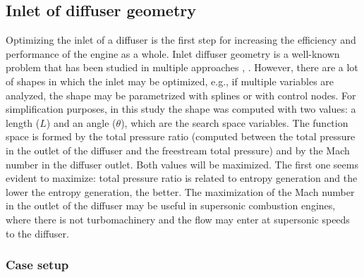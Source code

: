 \newpage

\subsection{Inlet of diffuser geometry}

Optimizing the inlet of a diffuser is the first step for increasing the efficiency and performance of the engine as a whole. Inlet diffuser geometry is a well-known problem that has been studied in multiple approaches \cite{djebedjian2004two}, \cite{schmandt2011diffuser}. However, there are a lot of shapes in which the inlet may be optimized, e.g., if multiple variables are analyzed, the shape may be parametrized with splines or with control nodes. For simplification purposes, in this study the shape was computed with two values: a length ($L$) and an angle ($\theta$), which are the search space variables. The function space is formed by the total pressure ratio (computed between the total pressure in the outlet of the diffuser and the freestream total pressure) and by the Mach number in the diffuser outlet. Both values will be maximized. The first one seems evident to maximize: total pressure ratio is related to entropy generation and the lower the entropy generation, the better. The maximization of the Mach number in the outlet of the diffuser may be useful in supersonic combustion engines, where there is not turbomachinery and the flow may enter at supersonic speeds to the diffuser. 

\subsubsection*{Case setup}

